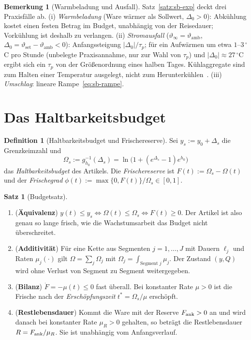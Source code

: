 \documentclass[a4paper, 12pt, twoside, openright]{report}
\theoremstyle{definition}
\newtheorem{definition}[theorem]{Definition}
\theoremstyle{definition}
\newtheorem{satz}{Satz}[chapter]
\newtheorem{bemerkung}{Bemerkung}[chapter]
\begin{document}
\begin{bemerkung}[Warmbeladung und Ausfall]\label{bem:sb-ausfall}
Satz~\ref{satz:sb-exp} deckt drei Praxisfälle ab. (i) \emph{Warmbeladung} (Ware wärmer als
Sollwert, $\Delta_0>0$): Abkühlung kostet einen festen Betrag im Budget, unabhängig von der
Reisedauer; Vorkühlung ist deshalb zu verlangen. (ii) \emph{Stromausfall} ($\vartheta_\infty=\vartheta_{\mathrm{amb}}$,
$\Delta_0=\vartheta_{\mathrm{set}}-\vartheta_{\mathrm{amb}}<0$): Anfangssteigung
$|\Delta_0|/\tau_p$; für ein Aufwärmen um etwa $1$--$3\,{}^\circ$C pro
Stunde (unbelegte Praxisannahme, nur zur Wahl von $\tau_p$) und $|\Delta_0|\approx 27\,{}^\circ$C
ergibt sich ein $\tau_p$ von der Größenordnung eines halben Tages. Kühlaggregate sind zum Halten einer
Temperatur ausgelegt, nicht zum Herunterkühlen~\cite{kn_reefer}. (iii) \emph{Umschlag}: lineare Rampe~\eqref{eq:sb-rampe}.
\end{bemerkung}

\section{Das Haltbarkeitsbudget}
\label{sec:sb-budget}

\begin{definition}[Haltbarkeitsbudget und Frischereserve]\label{def:sb-budget}
Sei $y_s:=y_0+\Delta_s$ die Grenzkeimzahl und
\begin{equation}
  \Omega_s:=g_{h_0}^{-1}(\Delta_s)=\ln\bigl(1+(e^{\Delta_s}-1)e^{h_0}\bigr)
  \label{eq:sb-Os}
\end{equation}
das \emph{Haltbarkeitsbudget} des Artikels. Die \emph{Frischereserve} ist
$F(t):=\Omega_s-\Omega(t)$ und der \emph{Frischegrad} $\phi(t):=\max\{0,F(t)\}/\Omega_s\in[0,1]$.
\end{definition}

\begin{satz}[Budgetsatz]\label{satz:sb-budget}
\begin{enumerate}
  \item (\textbf{Äquivalenz}) $y(t)\le y_s\iff\Omega(t)\le\Omega_s\iff F(t)\ge0$. Der Artikel ist
    also genau so lange frisch, wie die Wachstumsarbeit das Budget nicht überschreitet.
  \item (\textbf{Additivität}) Für eine Kette aus Segmenten $j=1,\dots,J$ mit Dauern $\ell_j$
    und Raten $\mu_j(\cdot)$ gilt $\Omega=\sum_j\Omega_j$ mit $\Omega_j=\int_{\text{Segment }j}\mu_j$.
    Der Zustand $(y,Q)$ wird ohne Verlust von Segment zu Segment weitergegeben.
  \item (\textbf{Bilanz}) $\dot F=-\mu(t)\le0$ fast überall. Bei konstanter Rate $\mu>0$ ist
    die Frische nach der \emph{Erschöpfungszeit} $t^\ast=\Omega_s/\mu$ erschöpft.
  \item (\textbf{Restlebensdauer}) Kommt die Ware mit der Reserve $F_{\rm ank}>0$ an und
    wird danach bei konstanter Rate $\mu_R>0$ gehalten, so beträgt die Restlebensdauer
    $R=F_{\rm ank}/\mu_R$. Sie ist unabhängig vom Anfangsverlauf.
\end{enumerate}
\end{satz}
\end{document}
